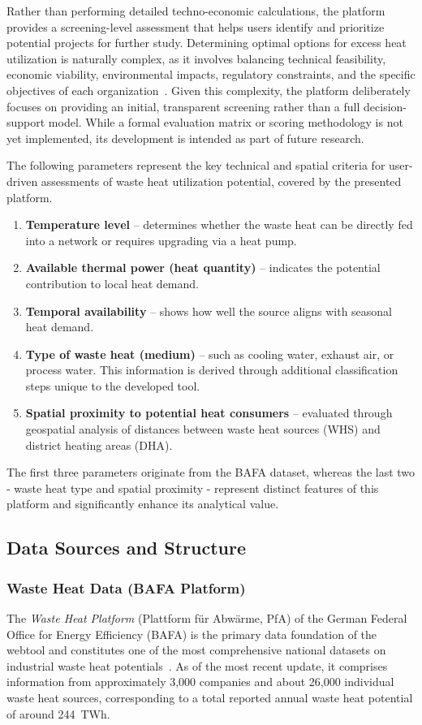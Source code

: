 \documentclass[letterpaper,11pt]{article}
\begin{document}
Rather than performing detailed techno-economic calculations, the platform provides a screening-level assessment that helps users identify and prioritize potential projects for further study. Determining optimal options for excess heat utilization is naturally complex, as it involves balancing technical feasibility, economic viability, environmental impacts, regulatory constraints, and the specific objectives of each organization~\cite{Montella.2025}. Given this complexity, the platform deliberately focuses on providing an initial, transparent screening rather than a full decision-support model. While a formal evaluation matrix or scoring methodology is not yet implemented, its development is intended as part of future research.

The following parameters represent the key technical and spatial criteria for user-driven assessments of waste heat utilization potential, covered by the presented platform.

\begin{enumerate}
	\item \textbf{Temperature level} – determines whether the waste heat can be directly fed into a network or requires upgrading via a heat pump.
	\item \textbf{Available thermal power (heat quantity)} – indicates the potential contribution to local heat demand.
	\item \textbf{Temporal availability} – shows how well the source aligns with seasonal heat demand.
	\item \textbf{Type of waste heat (medium)} – such as cooling water, exhaust air, or process water. This information is derived through additional classification steps unique to the developed tool.
	\item \textbf{Spatial proximity to potential heat consumers} – evaluated through geospatial analysis of distances between waste heat sources (WHS) and district heating areas (DHA).
\end{enumerate}

The first three parameters originate from the BAFA dataset, whereas the last two - waste heat type and spatial proximity - represent distinct features of this platform and significantly enhance its analytical value.

\subsection{Data Sources and Structure}
\subsubsection{Waste Heat Data (BAFA Platform)}
The \textit{Waste Heat Platform} (Plattform für Abwärme, PfA) of the German Federal Office for Energy Efficiency (BAFA) is the primary data foundation of the webtool and constitutes one of the most comprehensive national datasets on industrial waste heat potentials~\cite{bfee_pfa}. As of the most recent update, it comprises information from approximately 3,000 companies and about 26,000 individual waste heat sources, corresponding to a total reported annual waste heat potential of around 244~TWh.
\end{document}
